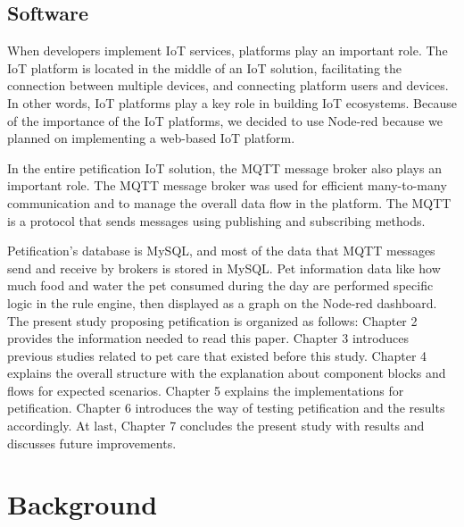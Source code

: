 \documentclass[conference]{IEEEtran}
\begin{document}
\subsection{Software}
When developers implement IoT services, platforms play an important role. The IoT platform is located in the middle of an IoT solution, facilitating the connection between multiple devices, and connecting platform users and devices. In other words, IoT platforms play a key role in building IoT ecosystems. Because of the importance of the IoT platforms, we decided to use Node-red because we planned on implementing a web-based IoT platform. 

In the entire petification IoT solution, the MQTT message broker also plays an important role. The MQTT message broker was used for efficient many-to-many communication and to manage the overall data flow in the platform. The MQTT is a protocol that sends messages using publishing and subscribing methods.

Petification's database is MySQL, and most of the data that MQTT messages send and receive by brokers is stored in MySQL.
Pet information data like how much food and water the pet consumed during the day are performed specific logic in the rule engine, then displayed as a graph on the Node-red dashboard.
\\

The present study proposing petification is organized as follows:
Chapter 2 
provides the information needed to read this paper.
Chapter 3 
introduces previous studies related to pet care that existed before this study. 
Chapter 4 
explains the overall structure with the explanation about component blocks and flows for expected scenarios.
Chapter 5 
explains the implementations for petification.
Chapter 6 
introduces the way of testing petification and the results accordingly.
At last, Chapter 7 
concludes the present study with results and discusses future improvements.

\section{Background}
\end{document}
